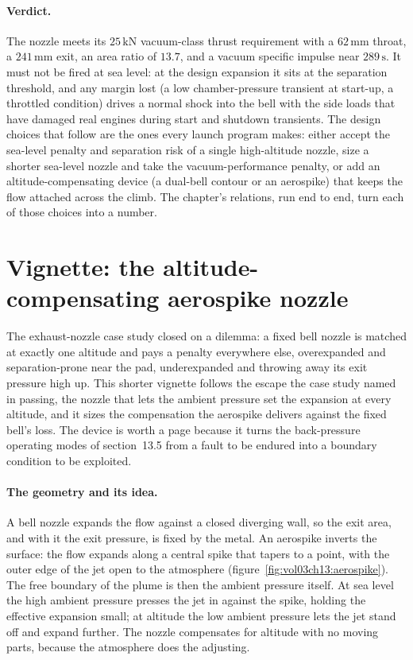 \paragraph{Verdict.} The nozzle meets its $25\,\text{kN}$ vacuum-class
thrust requirement with a $62\,\si{\milli\meter}$ throat, a
$241\,\si{\milli\meter}$ exit, an area ratio of $13.7$, and a vacuum
specific impulse near $289\,\si{\second}$. It must not be fired at sea
level: at the design expansion it sits at the separation threshold, and
any margin lost (a low chamber-pressure transient at start-up, a
throttled condition) drives a normal shock into the bell with the side
loads that have damaged real engines during start and shutdown
transients. The design choices that follow are the ones every launch
program makes: either accept the sea-level penalty and separation risk
of a single high-altitude nozzle, size a shorter sea-level nozzle and
take the vacuum-performance penalty, or add an altitude-compensating
device (a dual-bell contour or an aerospike) that keeps the flow
attached across the climb. The chapter's relations, run end to end,
turn each of those choices into a number.

\section{Vignette: the altitude-compensating aerospike
nozzle}

The exhaust-nozzle case study closed on a dilemma: a fixed bell nozzle
is matched at exactly one altitude and pays a penalty everywhere else,
overexpanded and separation-prone near the pad, underexpanded and
throwing away its exit pressure high up. This shorter vignette follows
the escape the case study named in passing, the 
nozzle that lets the ambient pressure set the expansion at every
altitude, and it sizes the compensation the aerospike delivers against
the fixed bell's loss. The device is worth a page because it turns the
back-pressure operating modes of section~13.5 from a fault to be endured
into a boundary condition to be exploited.

\paragraph{The geometry and its idea.} A bell nozzle expands the flow
against a closed diverging wall, so the exit area, and with it the exit
pressure, is fixed by the metal. An aerospike inverts the surface: the
flow expands along a central spike that tapers to a point, with the
outer edge of the jet open to the atmosphere
(figure~\ref{fig:vol03ch13:aerospike}). The free boundary of the plume
is then the ambient pressure itself. At sea level the high ambient
pressure presses the jet in against the spike, holding the effective
expansion small; at altitude the low ambient pressure lets the jet
stand off and expand further. The nozzle compensates for altitude with
no moving parts, because the atmosphere does the adjusting.

